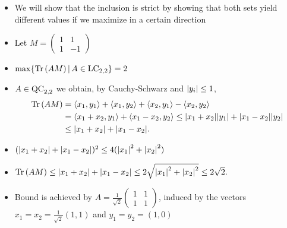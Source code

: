 \begin{frame}
	\begin{itemize}
		\item<1-> We will show that the inclusion is strict by showing that both sets yield different values if we maximize in a certain direction
		\item<2-> Let $M = \begin{pmatrix}
		1 & 1 \\ 1 & -1 
		\end{pmatrix} $
		\item<3-> $ \max \{  \text{Tr} \, {(AM)} \, | \, A \in \textup{LC}_{2,2} \} = 2 $
		\item <4->$ A \in \textup{QC}_{2,2} $ we obtain, by Cauchy-Schwarz and $ {\left|{y_i}\right|}\le 1 $,
		\begin{align*}
		\text{Tr} \, {(AM)} &= \langle x_1,y_1 \rangle + \langle x_1,y_2 \rangle + \langle x_2,y_1 \rangle - \langle x_2,y_2 \rangle   \\
		&= \langle x_1+x_2,y_1 \rangle + \langle x_1-x_2,y_2 \rangle  \le {\left|{x_1+x_2}\right|}{\left|{y_1}\right|} + {\left|{x_1-x_2}\right|}{\left|{y_2}\right|}  \\
		&\le {\left|{x_1+x_2}\right|} + {\left|{x_1-x_2}\right|}.
		\end{align*} 
		\item<5-> $({\left|{x_1+x_2}\right|} + {\left|{x_1-x_2}\right|})^2 \le  4({\left|{x_1}\right|}^2+{\left|{x_2}\right|}^2) $
		\item<6-> $\text{Tr} \, {(AM)}  \le {\left|{x_1+x_2}\right|} + {\left|{x_1-x_2}\right|} \le 2\sqrt{{\left|{x_1}\right|}^2+{\left|{x_2}\right|}^2} \le 2 \sqrt{2}. $
		\item<7-> Bound is achieved by  $ A = \frac{1}{\sqrt{2}}\begin{pmatrix}
		1 & 1 \\ 1 & 1 
		\end{pmatrix} $, induced by the vectors $ x_1 = x_2 = \frac{1}{\sqrt{2}}(1,1) $ and $ y_1 = y_2 =(1,0) $
	\end{itemize}
\end{frame}



